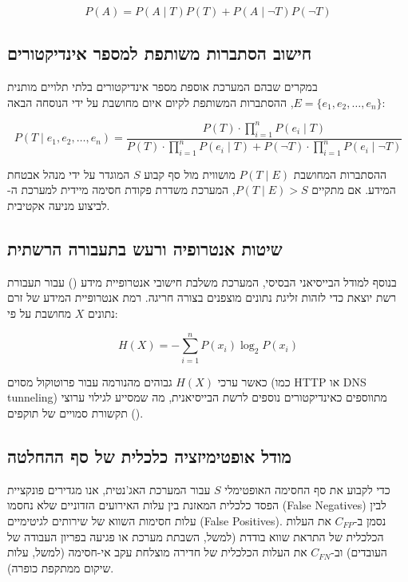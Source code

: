 \documentclass[11pt,a4paper]{article}
\begin{document}
\begin{equation}
P(A) = P(A \mid T)P(T) + P(A \mid \neg T)P(\neg T)
\label{eq:total_prob}
\end{equation}

\subsection{חישוב הסתברות משותפת למספר אינדיקטורים}
במקרים שבהם המערכת אוספת מספר אינדיקטורים בלתי תלויים מותנית $E = \{e_1, e_2, \dots, e_n\}$, ההסתברות המשותפת לקיום איום מחושבת על ידי הנוסחה הבאה:

\begin{equation}
P(T \mid e_1, e_2, \dots, e_n) = \frac{P(T) \cdot \prod_{i=1}^{n} P(e_i \mid T)}{P(T) \cdot \prod_{i=1}^{n} P(e_i \mid T) + P(\neg T) \cdot \prod_{i=1}^{n} P(e_i \mid \neg T)}
\label{eq:joint_prob}
\end{equation}

ההסתברות המחושבת $P(T \mid E)$ מושווית מול סף קבוע $S$ המוגדר על ידי מנהל אבטחת המידע. אם מתקיים $P(T \mid E) > S$, המערכת משדרת פקודת חסימה מיידית למערכת ה- לביצוע מניעה אקטיבית.

\subsection{שיטות אנטרופיה ורעש בתעבורה הרשתית}
בנוסף למודל הבייסיאני הבסיסי, המערכת משלבת חישובי אנטרופיית מידע () עבור תעבורת רשת יוצאת כדי לזהות זליגת נתונים מוצפנים בצורה חריגה. רמת אנטרופיית המידע של זרם נתונים $X$ מחושבת על פי:

\begin{equation}
H(X) = -\sum_{i=1}^{n} P(x_i) \log_2 P(x_i)
\end{equation}

כאשר ערכי $H(X)$ גבוהים מהנורמה עבור פרוטוקול מסוים (כמו HTTP או DNS tunneling) מתווספים כאינדיקטורים נוספים לרשת הבייסיאנית, מה שמסייע לגילוי ערוצי תקשורת סמויים של תוקפים ().

\subsection{מודל אופטימיזציה כלכלית של סף ההחלטה}
כדי לקבוע את סף החסימה האופטימלי $S$ עבור המערכת האג'נטית, אנו מגדירים פונקציית הפסד כלכלית המאזנת בין עלות האירועים הזדוניים שלא נחסמו (False Negatives) לבין עלות חסימות השווא של שירותים לגיטימיים (False Positives). נסמן ב-$C_{FP}$ את העלות הכלכלית של התראת שווא בודדת (למשל, השבתת מערכת או פגיעה בפריון העבודה של העובדים) וב-$C_{FN}$ את העלות הכלכלית של חדירה מוצלחת עקב אי-חסימה (למשל, עלות שיקום ממתקפת כופרה).
\end{document}
